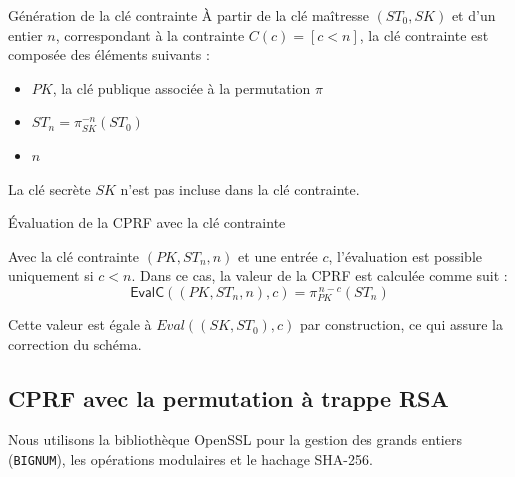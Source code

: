 \documentclass[9pt]{extarticle}
\begin{document}
\begin{defbox}{Génération de la clé contrainte}
À partir de la clé maîtresse $(ST_0, SK)$ et d’un entier $n$, correspondant à la contrainte
$C(c) = [c < n]$, la clé contrainte est composée des éléments suivants :
\begin{itemize}
  \item $PK$, la clé publique associée à la permutation $\pi$
  \item $ST_n = \pi_{SK}^{-n}(ST_0)$
  \item $n$
\end{itemize}

La clé secrète $SK$ n’est pas incluse dans la clé contrainte.
\end{defbox}

\begin{defbox}{Évaluation de la CPRF avec la clé contrainte}
    
Avec la clé contrainte $(PK, ST_n, n)$ et une entrée $c$, l’évaluation est possible uniquement si
$c < n$.
Dans ce cas, la valeur de la CPRF est calculée comme suit :
\[
\textsf{EvalC}((PK, ST_n, n), c) = \pi_{PK}^{\,n-c}(ST_n)
\]

Cette valeur est égale à $Eval((SK, ST_0), c)$ par construction, ce qui assure la correction du schéma.

\begin{center}
\end{center}

\end{defbox}



\subsection{CPRF avec la permutation à trappe RSA}

Nous utilisons la bibliothèque OpenSSL pour la gestion des grands entiers
(\texttt{BIGNUM}), les opérations modulaires et le hachage SHA-256.
\end{document}

